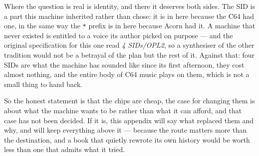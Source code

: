 Where the question is real is identity, and there it deserves both
sides. The SID is a part this machine inherited rather than chose: it is
in here because the C64 had one, in the same way the \texttt{*} prefix
is in here because Acorn had it. A machine that never existed is
entitled to a voice its author picked on purpose --- and the original
specification for this one read \emph{4 SIDs\slash OPL2}, so a
synthesiser of the other tradition would not be a betrayal of the plan
but the rest of it. Against that: four SIDs are what the machine has
sounded like since its first afternoon, they cost almost nothing, and
the entire body of C64 music plays on them, which is not a small thing
to hand back.

So the honest statement is that the chips are cheap, the case for
changing them is about what the machine wants to be rather than what it
can afford, and that case has not been decided. If it is, this appendix
will say what replaced them and why, and will keep everything above it
--- because the route matters more than the destination, and a book that
quietly rewrote its own history would be worth less than one that admits
what it tried.

